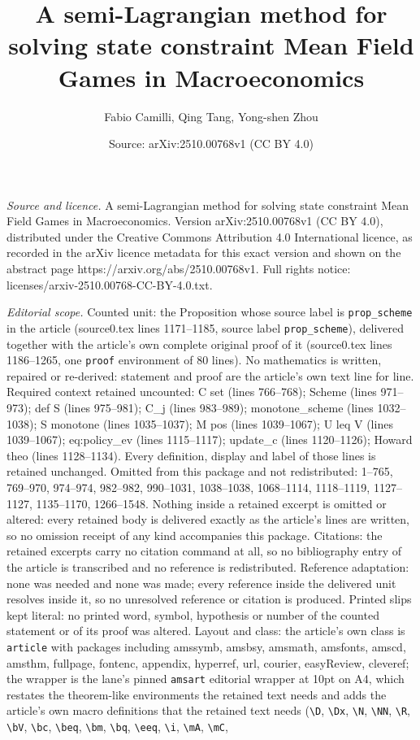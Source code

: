\documentclass[10pt,a4paper]{amsart}
\title[A semi-Lagrangian method for solving state constraint Mean F]{A semi-Lagrangian method for solving state constraint Mean Field Games in Macroeconomics}
\author{Fabio Camilli, Qing Tang, Yong-shen Zhou}
\date{Source: arXiv:2510.00768v1 (CC BY 4.0)}
\begin{document}
\maketitle

\noindent\emph{Source and licence.} A semi-Lagrangian method for solving state constraint Mean Field Games in Macroeconomics. Version arXiv:2510.00768v1 (CC BY 4.0), distributed under the Creative Commons Attribution 4.0 International licence, as recorded in the arXiv licence metadata for this exact version and shown on the abstract page https://arxiv.org/abs/2510.00768v1. Full rights notice: licenses/arxiv-2510.00768-CC-BY-4.0.txt.\par\smallskip

\noindent\textit{Editorial scope.} Counted unit: the Proposition whose source label is \texttt{prop\_scheme} in the article (source0.tex lines 1171--1185, source label \texttt{prop\_scheme}), delivered together with the article's own complete original proof of it (source0.tex lines 1186--1265, one \texttt{proof} environment of 80 lines). No mathematics is written, repaired or re-derived: statement and proof are the article's own text line for line. Required context retained uncounted: C set (lines 766--768); Scheme (lines 971--973); def S (lines 975--981); C\_j (lines 983--989); monotone\_scheme (lines 1032--1038); S monotone (lines 1035--1037); M pos (lines 1039--1067); U leq V (lines 1039--1067); eq:policy\_ev (lines 1115--1117); update\_c (lines 1120--1126); Howard theo (lines 1128--1134). Every definition, display and label of those lines is retained unchanged. Omitted from this package and not redistributed: 1--765, 769--970, 974--974, 982--982, 990--1031, 1038--1038, 1068--1114, 1118--1119, 1127--1127, 1135--1170, 1266--1548. Nothing inside a retained excerpt is omitted or altered: every retained body is delivered exactly as the article's lines are written, so no omission receipt of any kind accompanies this package. Citations: the retained excerpts carry no citation command at all, so no bibliography entry of the article is transcribed and no reference is redistributed. Reference adaptation: none was needed and none was made; every reference inside the delivered unit resolves inside it, so no unresolved reference or citation is produced. Printed slips kept literal: no printed word, symbol, hypothesis or number of the counted statement or of its proof was altered. Layout and class: the article's own class is \texttt{article} with packages including amssymb, amsbsy, amsmath, amsfonts, amscd, amsthm, fullpage, fontenc, appendix, hyperref, url, courier, easyReview, cleveref; the wrapper is the lane's pinned \texttt{amsart} editorial wrapper at 10pt on A4, which restates the theorem-like environments the retained text needs and adds the article's own macro definitions that the retained text needs (\texttt{\textbackslash D}, \texttt{\textbackslash Dx}, \texttt{\textbackslash N}, \texttt{\textbackslash NN}, \texttt{\textbackslash R}, \texttt{\textbackslash bV}, \texttt{\textbackslash bc}, \texttt{\textbackslash beq}, \texttt{\textbackslash bm}, \texttt{\textbackslash bq}, \texttt{\textbackslash eeq}, \texttt{\textbackslash i}, \texttt{\textbackslash mA}, \texttt{\textbackslash mC}, 
\end{document}
